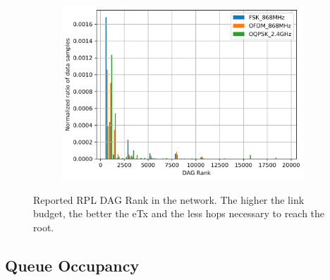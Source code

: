\documentclass[journal]{IEEEtran}
\begin{document}
\begin{figure}[ht!]
\begin{subfigure}{0.6\columnwidth}
		\centering
	\includegraphics[width=1\columnwidth]{dagRank_pdf_plot_full_all_normalized}
	\label{fig:dagRank_pdf}
	\end{subfigure}%

	\caption{Reported RPL DAG Rank in the network. The higher the link budget, the better the eTx and the less hops necessary to reach the root.} 
	\label{fig:dagrank_all}
\end{figure}
\subsection{Queue Occupancy}
\label{sec:queue}




\end{document}
